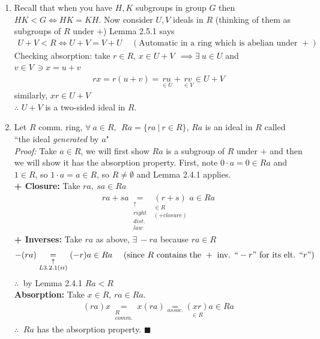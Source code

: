\begin{enumerate}
    \item Recall that when you have $H,K$ subgroups in group $G$ then $HK<G \iff HK=KH$. Now
    consider $U,V$ ideals in $R$ (thinking of them as subgroups of $R$ under $+$) Lemma 2.5.1 says
    \begin{align}
        U+V<R \iff U+V=V+U \ \ \ \ \ (\text{Automatic in a ring which is abelian under }+) \nonumber
    \end{align}
    Checking absorption: take $r\in R$, $x\in U+V \ \ \implies \exists \ u\in U $ and
    $v\in V \ \ni x=u+v$
    \begin{align}
        rx=r(u+v)=\underset{\in U}{ru} + \underset{\in V}{rv} \in U+V \nonumber
    \end{align}
    similarly, $xr \in U+V$\\
    $\therefore$ $U+V$ is a two-sided ideal in $R$.
    \item Let $R$ comm. ring, $\forall \ a\in R, \ \ Ra=\{ra \ | \ r\in R\}$, $Ra$ is an ideal in
    $R$ called ``the ideal \textit{generated} by $a$"\\
    \textit{Proof:} Take $a\in R$, we will first show $Ra$ is a subgroup of $R$ under $+$ and then
    we will show it has the absorption property. First, note $0\cdot a=0\in Ra$ and $1\in R$, so
    $1\cdot a=a\in R$, so $R\neq \emptyset$ and Lemma 2.4.1 applies.\\
    \textbf{+ Closure:} Take $ra, \ sa \in Ra$
    \begin{align}
        ra+sa\underset{\substack{\uparrow \\ right \\dist. \\law}}{=}\underset{\substack{\in R \\ (+ closure)}}{(r+s)}a \in Ra \nonumber
    \end{align}
    \textbf{+ Inverses:} Take $ra$ as above, $\exists \ -ra$ because $ra\in R$
    \begin{align}
        -(ra)\underset{\substack{\uparrow \\ L3.2.1 (ii)}}{=} (-r)a\in Ra \ \ \ \ (\text{since }R \text{ contains the }+\text{ inv. ``}-r"\text{ for its elt. ``} r") \nonumber
    \end{align}
    $\therefore \ $ by Lemma 2.4.1 $Ra<R$ \\ \steezybreak
    \textbf{Absorption:} Take $x\in R$, $ra\in Ra$.
    \begin{align}
        (ra)x \underset{\substack{R \\ comm.}}{=} x(ra) \underset{assoc.}{=} \underset{\in R}{(xr)}a \in Ra \nonumber
    \end{align}
    $\therefore \ $ $Ra$ has the absorption property.  $\blacksquare$
\end{enumerate}\steezybreak
